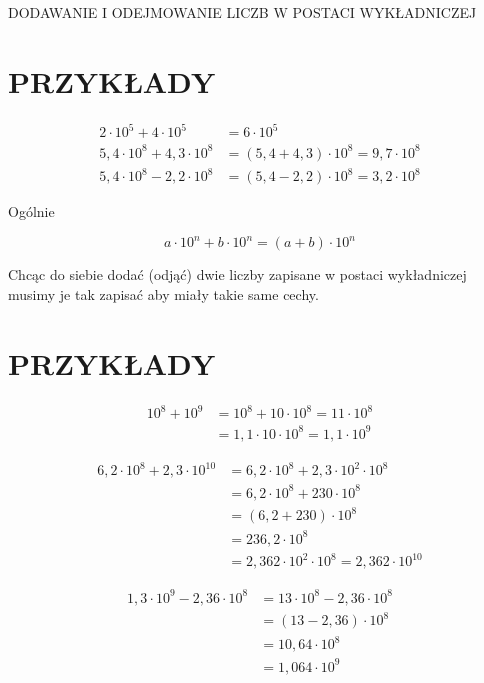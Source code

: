 \documentclass[10pt]{article}
\begin{document}
DODAWANIE I ODEJMOWANIE LICZB W POSTACI WYKŁADNICZEJ

\section*{PRZYKŁADY}
\[
\begin{aligned}
2 \cdot 10^{5}+4 \cdot 10^{5} & =6 \cdot 10^{5} \\
5,4 \cdot 10^{8}+4,3 \cdot 10^{8} & =(5,4+4,3) \cdot 10^{8}=9,7 \cdot 10^{8} \\
5,4 \cdot 10^{8}-2,2 \cdot 10^{8} & =(5,4-2,2) \cdot 10^{8}=3,2 \cdot 10^{8}
\end{aligned}
\]

Ogólnie

\[
a \cdot 10^{n}+b \cdot 10^{n}=(a+b) \cdot 10^{n}
\]

Chcąc do siebie dodać (odjąć) dwie liczby zapisane w postaci wykładniczej musimy je tak zapisać aby miały takie same cechy.

\section*{PRZYKŁADY}
\[
\begin{aligned}
10^{8}+10^{9} & =10^{8}+10 \cdot 10^{8}=11 \cdot 10^{8} \\
& =1,1 \cdot 10 \cdot 10^{8}=1,1 \cdot 10^{9}
\end{aligned}
\]

\[
\begin{aligned}
6,2 \cdot 10^{8}+2,3 \cdot 10^{10} & =6,2 \cdot 10^{8}+2,3 \cdot 10^{2} \cdot 10^{8} \\
& =6,2 \cdot 10^{8}+230 \cdot 10^{8} \\
& =(6,2+230) \cdot 10^{8} \\
& =236,2 \cdot 10^{8} \\
& =2,362 \cdot 10^{2} \cdot 10^{8}=2,362 \cdot 10^{10}
\end{aligned}
\]

\[
\begin{aligned}
1,3 \cdot 10^{9}-2,36 \cdot 10^{8} & =13 \cdot 10^{8}-2,36 \cdot 10^{8} \\
& =(13-2,36) \cdot 10^{8} \\
& =10,64 \cdot 10^{8} \\
& =1,064 \cdot 10^{9}
\end{aligned}
\]
\end{document}

